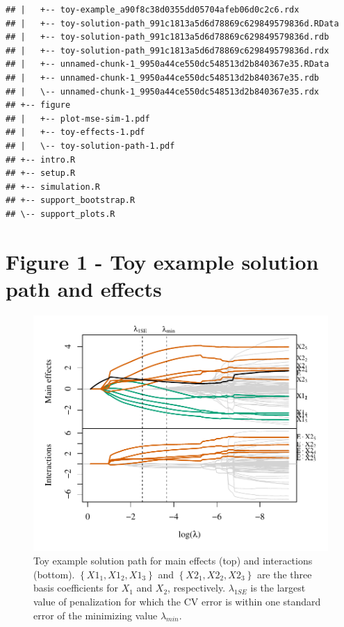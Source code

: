 \documentclass[12pt,letter]{article}\usepackage[]{graphicx}\usepackage[]{color}
\makeatletter
\newenvironment{kframe}{%
 \def\at@end@of@kframe{}%
 \ifinner\ifhmode%
  \def\at@end@of@kframe{\end{minipage}}%
  \begin{minipage}{\columnwidth}%
 \fi\fi%
 \def\FrameCommand##1{\hskip\@totalleftmargin \hskip-\fboxsep
 \colorbox{shadecolor}{##1}\hskip-\fboxsep
     \hskip-\linewidth \hskip-\@totalleftmargin \hskip\columnwidth}%
 \MakeFramed {\advance\hsize-\width
   \@totalleftmargin\z@ \linewidth\hsize
   \@setminipage}}%
 {\par\unskip\endMakeFramed%
 \at@end@of@kframe}
\newenvironment{knitrout}{}{} %
\makeatother
\begin{document}
\begin{knitrout}
\begin{kframe}
\begin{verbatim}
## |   +-- toy-example_a90f8c38d0355dd05704afeb06d0c2c6.rdx
## |   +-- toy-solution-path_991c1813a5d6d78869c629849579836d.RData
## |   +-- toy-solution-path_991c1813a5d6d78869c629849579836d.rdb
## |   +-- toy-solution-path_991c1813a5d6d78869c629849579836d.rdx
## |   +-- unnamed-chunk-1_9950a44ce550dc548513d2b840367e35.RData
## |   +-- unnamed-chunk-1_9950a44ce550dc548513d2b840367e35.rdb
## |   \-- unnamed-chunk-1_9950a44ce550dc548513d2b840367e35.rdx
## +-- figure
## |   +-- plot-mse-sim-1.pdf
## |   +-- toy-effects-1.pdf
## |   \-- toy-solution-path-1.pdf
## +-- intro.R
## +-- setup.R
## +-- simulation.R
## +-- support_bootstrap.R
## \-- support_plots.R
\end{verbatim}
\end{kframe}
\end{knitrout}


\section{Figure 1 - Toy example solution path and effects}




\begin{knitrout}\scriptsize
{}\color{fgcolor}\begin{figure}[H]

{\centering \includegraphics[width=1\linewidth]{figure/toy-solution-path-1} 

}

\caption[Toy example solution path for main effects (top) and interactions (bottom)]{Toy example solution path for main effects (top) and interactions (bottom). $\left\lbrace X1_1, X1_2, X1_3 \right\rbrace$ and $\left\lbrace X2_1, X2_2, X2_3 \right\rbrace$ are the three basis coefficients for $X_1$ and $X_2$, respectively. $\lambda_{1SE}$ is the largest value of penalization for which the CV error is within one standard error of the minimizing value $\lambda_{min}$.}\label{fig:toy-solution-path}
\end{figure}

\end{knitrout}
\end{document}
